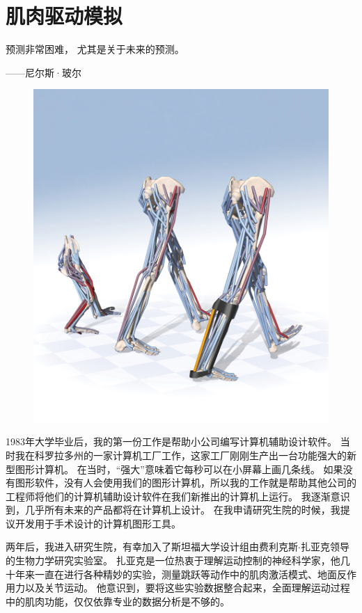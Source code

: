 \chapter{肌肉驱动模拟} \label{chap:chap10}


预测非常困难，
尤其是关于未来的预测。
\begin{flushright}
	——尼尔斯·玻尔
\end{flushright}

\begin{figure}[!htb]
	\centering
	\includegraphics[width=0.9\linewidth]{chap10/10_0}
	\caption*{ \label{fig:10_0}}
\end{figure}

1983年大学毕业后，我的第一份工作是帮助小公司编写计算机辅助设计软件。
当时我在科罗拉多州的一家计算机工厂工作，这家工厂刚刚生产出一台功能强大的新型图形计算机。
在当时，“强大”意味着它每秒可以在小屏幕上画几条线。
如果没有图形软件，没有人会使用我们的图形计算机，所以我的工作就是帮助其他公司的工程师将他们的计算机辅助设计软件在我们新推出的计算机上运行。
我逐渐意识到，几乎所有未来的产品都将在计算机上设计。
在我申请研究生院的时候，我提议开发用于手术设计的计算机图形工具。


两年后，我进入研究生院，有幸加入了斯坦福大学设计组由费利克斯$\cdot$扎亚克领导的生物力学研究实验室。
扎亚克是一位热衷于理解运动控制的神经科学家，他几十年来一直在进行各种精妙的实验，测量跳跃等动作中的肌肉激活模式、地面反作用力以及关节运动。
他意识到，要将这些实验数据整合起来，全面理解运动过程中的肌肉功能，仅仅依靠专业的数据分析是不够的。


